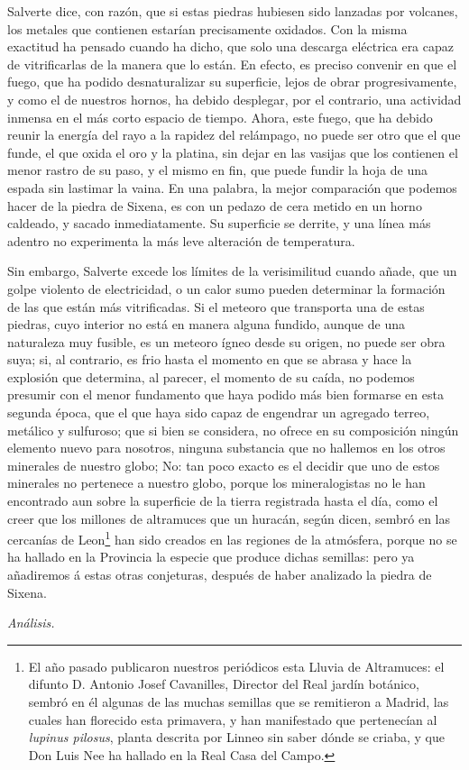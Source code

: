 \documentclass[a4paper, 12pt, oneside, spanish]{article}
\begin{document}
Salverte dice, con razón, que si estas piedras hubiesen sido lanzadas por volcanes, los metales que contienen estarían precisamente oxidados. Con la misma exactitud ha pensado cuando ha dicho, que solo una descarga eléctrica era capaz de vitrificarlas de la manera que lo están. En efecto, es preciso convenir en que el fuego, que ha podido desnaturalizar su superficie, lejos de obrar progresivamente, y como el de nuestros hornos, ha debido desplegar, por el contrario, una actividad inmensa en el más corto espacio de tiempo. Ahora, este fuego, que ha debido reunir la energía del rayo a la rapidez del relámpago, no puede ser otro que el que funde, el que oxida el oro y la platina, sin dejar en las vasijas que los contienen el menor rastro de su paso, y el mismo en fin, que puede fundir la hoja de una espada sin lastimar la vaina. En una palabra, la mejor comparación que podemos hacer de la piedra de Sixena, es con un pedazo de cera metido en un horno caldeado, y sacado inmediatamente. Su superficie se derrite, y una línea más adentro no experimenta la más leve alteración de temperatura.

Sin embargo, Salverte excede los límites de la verisimilitud cuando añade, que un golpe violento de electricidad, o un calor sumo pueden determinar la formación de las que están más vitrificadas. Si el meteoro que transporta una de estas piedras, cuyo interior no está en manera alguna fundido, aunque de una naturaleza muy fusible, es un meteoro ígneo desde su origen, no puede ser obra suya; si, al contrario, es frio hasta el momento en que se abrasa y hace la explosión que determina, al parecer, el momento de su caída, no podemos presumir con el menor fundamento que haya podido más bien formarse en esta segunda época, que el que haya sido capaz de engendrar un agregado terreo, metálico y sulfuroso; que si bien se considera, no ofrece en su composición ningún elemento nuevo para nosotros, ninguna substancia que no hallemos en los otros minerales de nuestro globo; No: tan poco exacto es el decidir que uno de estos minerales no pertenece a nuestro globo, porque los mineralogistas no le han encontrado aun sobre la superficie de la tierra registrada hasta el día, como el creer que los millones de altramuces que un huracán, según dicen, sembró en las cercanías de Leon\footnote{\Fontauri El año pasado publicaron nuestros periódicos esta Lluvia de Altramuces: el difunto D. Antonio Josef Cavanilles, Director del Real jardín botánico, sembró en él algunas de las muchas semillas que se remitieron a Madrid, las cuales han florecido esta primavera, y han manifestado que pertenecían al \emph{lupinus pilosus}, planta descrita por Linneo sin saber dónde se criaba, y que Don Luis Nee ha hallado en la Real Casa del Campo.} han sido creados en las regiones de la atmósfera, porque no se ha hallado en la Provincia la especie que produce dichas semillas: pero ya añadiremos á estas otras conjeturas, después de haber analizado la piedra de Sixena.
\begin{center}
\emph{Análisis.}
\end{center}
\end{document}
